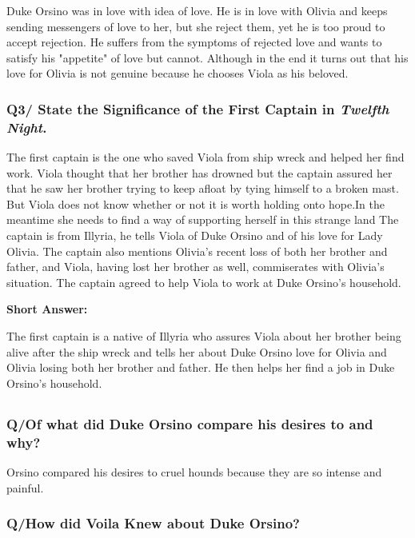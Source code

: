 \documentclass[12pt, a4paper]{article}
\begin{document}
Duke Orsino was in love with idea of love. He is in love with Olivia
and keeps sending messengers of love to her, but she reject them, yet he 
is too proud to accept rejection. He suffers from the symptoms of 
rejected love and wants to satisfy his "appetite" of love but cannot.
Although in the end it turns out that his love for Olivia is not genuine
because he chooses Viola as his beloved.

\subsubsection*{Q3/ State the Significance of the First Captain in 
\textit{Twelfth Night}.}

The first captain is the one who saved Viola from ship wreck and 
helped her find work. Viola thought that her brother has drowned but 
the captain assured her that he saw her brother trying to keep afloat 
by tying himself to a broken mast. But Viola does not know whether 
or not it is worth holding onto hope.In the meantime she needs to find 
a way of supporting herself in this strange land The captain is from 
Illyria, he tells Viola of Duke Orsino and of his love for Lady Olivia. 
The captain also mentions Olivia's recent loss of both her brother and 
father,  and Viola, having lost her brother as well, commiserates with 
Olivia's situation. The captain agreed to help Viola to work at Duke 
Orsino's household.\medbreak

\textbf{Short Answer:}\smallbreak

The first captain is a native of Illyria who assures Viola about her
brother being alive after the ship wreck and tells her about Duke Orsino
love for Olivia and Olivia losing both her brother and father. 
He then helps her find a job in Duke Orsino's household.

\subsection*{}\bigbreak

\subsubsection*{Q/Of what did Duke Orsino compare his desires to and why?}

Orsino compared his desires to cruel hounds because they are so intense 
and painful.

\subsubsection*{Q/How did Voila Knew about Duke Orsino?}
\end{document}
